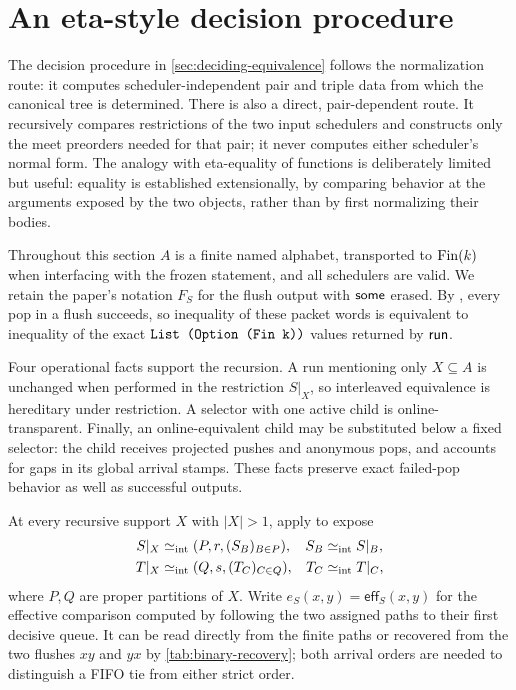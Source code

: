 \section{An eta-style decision procedure}
\label{sec:eta-decision}

The decision procedure in \autoref{sec:deciding-equivalence} follows the
normalization route: it computes scheduler-independent pair and triple data
from which the canonical tree is determined.  There is also a direct,
pair-dependent route.  It recursively compares restrictions of the two input
schedulers and constructs only the meet preorders needed for that pair; it
never computes either scheduler's normal form.  The analogy with eta-equality
of functions is deliberately limited but useful: equality is established
extensionally, by comparing behavior at the arguments exposed by the two
objects, rather than by first normalizing their bodies.

Throughout this section \(A\) is a finite named alphabet, transported to
\(\operatorname{Fin}(k)\) when interfacing with the frozen statement, and all schedulers are
valid.  We retain the paper's notation \(F_S\) for the flush output with
\(\mathsf{some}\) erased.  By , every pop in a flush succeeds, so
inequality of these packet words is equivalent to inequality of the exact
\(\texttt{List (Option (Fin k))}\) values returned by \(\mathsf{run}\).

Four operational facts support the recursion.  A run mentioning only
\(X\subseteq A\) is unchanged when performed in the restriction \(S|_X\), so
interleaved equivalence is hereditary under restriction.  A selector with one
active child is online-transparent.  Finally, an online-equivalent child may
be substituted below a fixed selector: the child receives projected pushes
and anonymous pops, and  accounts for gaps in its
global arrival stamps.  These facts preserve exact failed-pop behavior as
well as successful outputs.

At every recursive support \(X\) with \(|X|>1\), apply
 to expose
\begin{equation}
 \begin{aligned}
  S|_X&\mathrel{\simeq_{\mathrm{int}}} (P,r,(S_B)_{B\in P}),
  &S_B&\mathrel{\simeq_{\mathrm{int}}} S|_B,\\
  T|_X&\mathrel{\simeq_{\mathrm{int}}} (Q,s,(T_C)_{C\in Q}),
  &T_C&\mathrel{\simeq_{\mathrm{int}}} T|_C,
 \end{aligned}
 \label{eq:eta-exposures}
\end{equation}
where \(P,Q\) are proper partitions of \(X\).  Write
\(e_S(x,y)=\mathsf{eff}_S(x,y)\) for the effective comparison computed by
following the two assigned paths to their first decisive queue.  It can be
read directly from the finite paths or recovered from the two flushes \(xy\)
and \(yx\) by \autoref{tab:binary-recovery}; both arrival orders are needed to
distinguish a FIFO tie from either strict order.

